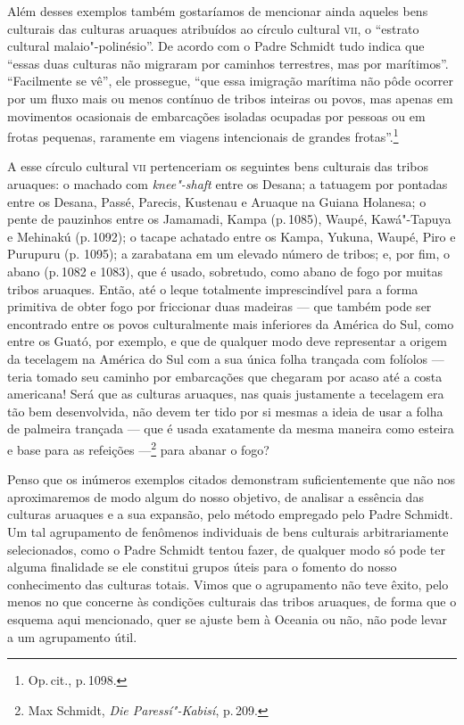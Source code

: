 Além desses exemplos também gostaríamos de mencionar ainda aqueles bens
culturais das culturas aruaques atribuídos ao círculo cultural \textsc{vii}, o
``estrato cultural malaio"-polinésio''. De acordo com o Padre Schmidt
tudo indica que ``essas duas culturas não migraram por caminhos
terrestres, mas por marítimos''. ``Facilmente se vê'', ele prossegue,
``que essa imigração marítima não pôde ocorrer por um fluxo mais ou
menos contínuo de tribos inteiras ou povos, mas apenas em movimentos
ocasionais de embarcações isoladas ocupadas por pessoas ou em frotas
pequenas, raramente em viagens intencionais de grandes
frotas''.\footnote{Op.\,cit., p.\,1098.}

A esse círculo cultural \textsc{vii} pertenceriam os seguintes bens culturais das
tribos aruaques: o machado com \textit{knee"-shaft}
entre os Desana; a tatuagem por pontadas entre os Desana, Passé, Parecis,
Kustenau e Aruaque na Guiana Holanesa; o pente de pauzinhos entre os
Jamamadi, Kampa (p.\,1085), Waupé, Kawá"-Tapuya e Mehinakú (p.\,1092); o
tacape achatado entre os Kampa, Yukuna, Waupé, Piro e Purupuru (p.
1095); a zarabatana em um elevado número de tribos; e, por fim, o abano
(p.\,1082 e 1083), que é usado, sobretudo, como abano de fogo por muitas
tribos aruaques. Então, até o leque totalmente imprescindível para a
forma primitiva de obter fogo por friccionar duas madeiras ---
que também pode ser encontrado entre os
povos culturalmente mais inferiores da América do Sul, como entre os
Guató, por exemplo, e que de qualquer modo deve representar a origem da
tecelagem na América do Sul com a sua única folha trançada com folíolos
--- teria tomado seu caminho por embarcações que chegaram por acaso até a
costa americana! Será que as culturas aruaques, nas quais justamente a
tecelagem era tão bem desenvolvida, não devem ter tido por si mesmas a
ideia de usar a folha de palmeira trançada --- que é usada exatamente da
mesma maneira como esteira e base para as refeições ---\footnote{Max
  Schmidt, \textit{Die Paressí"-Kabisí}, p.\,209.}  para abanar o
fogo?


Penso que os inúmeros exemplos citados demonstram suficientemente que
não nos aproximaremos de modo algum do nosso objetivo, de analisar a
essência das culturas aruaques e a sua expansão, pelo método empregado
pelo Padre Schmidt. Um tal agrupamento de fenômenos individuais de bens
culturais arbitrariamente selecionados, como o Padre Schmidt tentou
fazer, de qualquer modo só pode ter alguma finalidade se ele constitui
grupos úteis para o fomento do nosso conhecimento das culturas totais.
Vimos que o agrupamento não teve êxito, pelo menos no que concerne às
condições culturais das tribos aruaques, de forma que o esquema aqui
mencionado, quer se ajuste bem à Oceania ou não, não pode levar a um
agrupamento útil.

